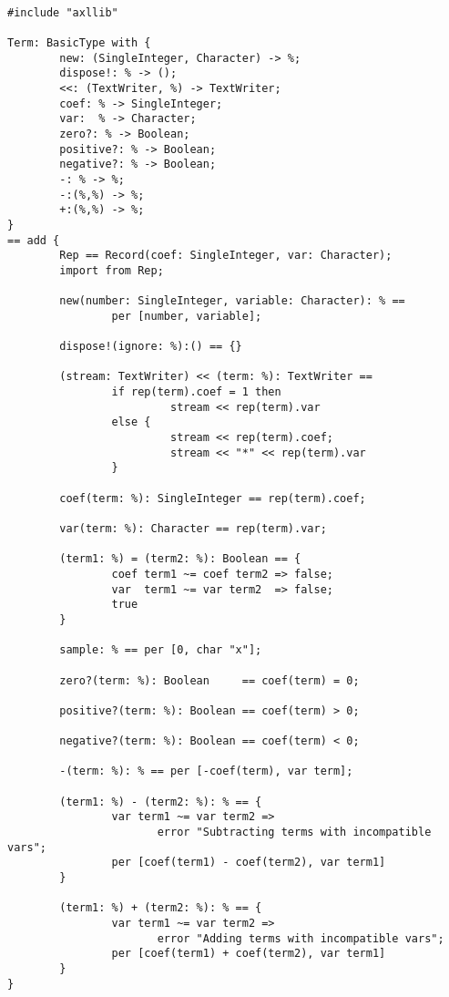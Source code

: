 \begin{small}
\begin{verbatim}

#include "axllib"

Term: BasicType with {
        new: (SingleInteger, Character) -> %;
        dispose!: % -> ();
        <<: (TextWriter, %) -> TextWriter;
        coef: % -> SingleInteger;
        var:  % -> Character;
        zero?: % -> Boolean;
        positive?: % -> Boolean;
        negative?: % -> Boolean;
        -: % -> %;
        -:(%,%) -> %;
        +:(%,%) -> %;
}
== add {
        Rep == Record(coef: SingleInteger, var: Character);
        import from Rep;

        new(number: SingleInteger, variable: Character): % == 
                per [number, variable];

        dispose!(ignore: %):() == {}

        (stream: TextWriter) << (term: %): TextWriter ==
                if rep(term).coef = 1 then
                         stream << rep(term).var
                else {
                         stream << rep(term).coef;
                         stream << "*" << rep(term).var
                }

        coef(term: %): SingleInteger == rep(term).coef;

        var(term: %): Character == rep(term).var;

        (term1: %) = (term2: %): Boolean == {
                coef term1 ~= coef term2 => false;
                var  term1 ~= var term2  => false;
                true
        }

        sample: % == per [0, char "x"];

        zero?(term: %): Boolean     == coef(term) = 0;

        positive?(term: %): Boolean == coef(term) > 0;

        negative?(term: %): Boolean == coef(term) < 0;

        -(term: %): % == per [-coef(term), var term];

        (term1: %) - (term2: %): % == {
                var term1 ~= var term2 => 
                       error "Subtracting terms with incompatible vars";
                per [coef(term1) - coef(term2), var term1]
        }

        (term1: %) + (term2: %): % == {
                var term1 ~= var term2 => 
                       error "Adding terms with incompatible vars";
                per [coef(term1) + coef(term2), var term1]
        }
}


\end{verbatim}
\end{small}
